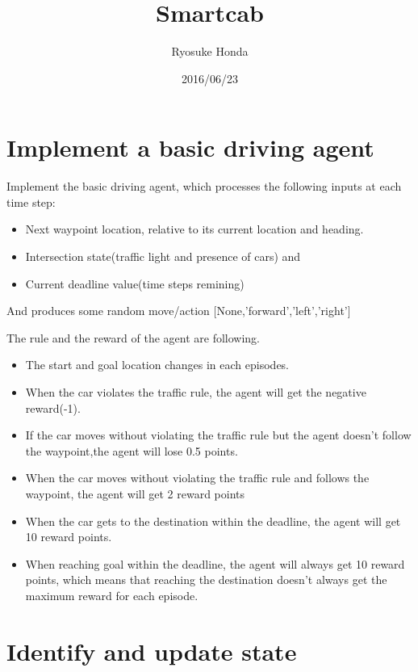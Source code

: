 \documentclass[a4paper,11pt]{article}
\begin{document}
\title{Smartcab}
\author{Ryosuke Honda}
\date{2016/06/23}
\maketitle




\section{Implement a basic driving agent}
Implement the basic driving agent, which processes the following inputs at each time step:
\begin{itemize}
\item Next waypoint location, relative to its current location and heading.
\item Intersection state(traffic light and presence of cars) and
\item Current deadline value(time steps remining)
\end{itemize}
And produces some random move/action [None,'forward','left','right']


The rule and the reward of the agent are following.
\begin{itemize}
\item The start and goal location changes in each episodes.
\item When the car violates the traffic rule, the agent will get the negative reward(-1).
\item If the car moves without violating the traffic rule but the agent doesn't follow the waypoint,the agent will lose 0.5 points.
\item When the car moves without violating the traffic rule and follows the waypoint, the agent will get 2 reward points
\item When the car gets to the destination within the deadline, the agent will get 10 reward points.
\item When reaching goal within the deadline, the agent will always get 10 reward points, which means that reaching the destination doesn't always get the maximum reward for each episode.
 
\end{itemize}






\section{Identify and update state}
\end{document}

